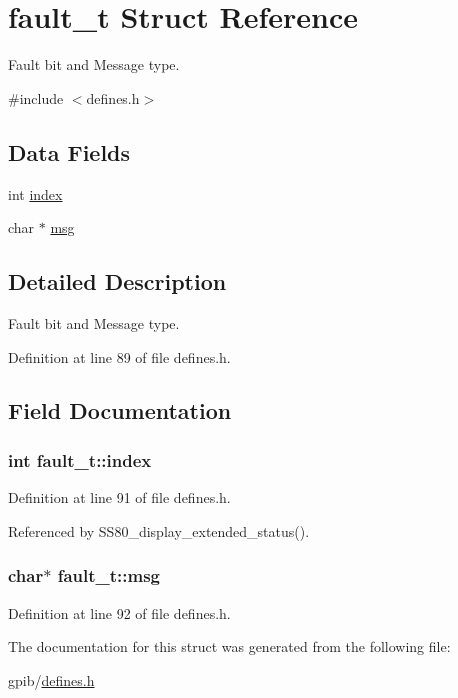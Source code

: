 \hypertarget{structfault__t}{}\section{fault\+\_\+t Struct Reference}
\label{structfault__t}


Fault bit and Message type.  




{\ttfamily \#include $<$defines.\+h$>$}

\subsection*{Data Fields}
\begin{DoxyCompactItemize}
\item 
int \hyperlink{structfault__t_a540c9496df912b65e22c50b6a40535ef}{index}
\item 
char $\ast$ \hyperlink{structfault__t_a9037306efc26edf60b59bc1ee6843c69}{msg}
\end{DoxyCompactItemize}


\subsection{Detailed Description}
Fault bit and Message type. 

Definition at line 89 of file defines.\+h.



\subsection{Field Documentation}
\subsubsection[{\texorpdfstring{index}{index}}]{\setlength{\rightskip}{0pt plus 5cm}int fault\+\_\+t\+::index}\hypertarget{structfault__t_a540c9496df912b65e22c50b6a40535ef}{}\label{structfault__t_a540c9496df912b65e22c50b6a40535ef}


Definition at line 91 of file defines.\+h.



Referenced by S\+S80\+\_\+display\+\_\+extended\+\_\+status().

\subsubsection[{\texorpdfstring{msg}{msg}}]{\setlength{\rightskip}{0pt plus 5cm}char$\ast$ fault\+\_\+t\+::msg}\hypertarget{structfault__t_a9037306efc26edf60b59bc1ee6843c69}{}\label{structfault__t_a9037306efc26edf60b59bc1ee6843c69}


Definition at line 92 of file defines.\+h.



The documentation for this struct was generated from the following file\+:\begin{DoxyCompactItemize}
\item 
gpib/\hyperlink{defines_8h}{defines.\+h}\end{DoxyCompactItemize}
